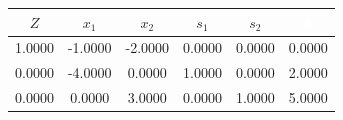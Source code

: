 \begin{table}[H]
\centering
\begin{tabular}{|c|c|c|c|c|c|}
\hline
\cellcolor{red} $Z$ & \cellcolor{orange} $x_{1}$ & \cellcolor{orange} $x_{2}$ & \cellcolor{yellow} $s_{1}$ & \cellcolor{yellow} $s_{2}$ & \cellcolor{black} \textcolor{white}{$b$} \\ 
\hline
1.0000 & -1.0000 & -2.0000 & 0.0000 & 0.0000 & 0.0000 \\ 
\hline
0.0000 & -4.0000 & 0.0000 & 1.0000 & 0.0000 & 2.0000 \\ 
\hline
0.0000 & 0.0000 & 3.0000 & 0.0000 & 1.0000 & 5.0000 \\ 
\hline
\end{tabular}
\end{table}
